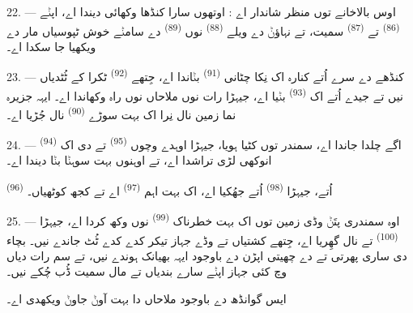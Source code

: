 22. --- اوس بالاخانے توں منظر شاندار اے : اوتھوں سارا کنڈھا وکھائی دیندا اے، اپݨے
 \textsuperscript{(86)} تے 
\textsuperscript{(87)} سمیت، تے نہاؤݨ دے ویلے 
\textsuperscript{(88)} نوں  \textsuperscript{(89)} دے سامݨے خوش ٹپوسیاں
مار دے ویکھیا جا سکدا اے۔

23. --- کنڈھے دے سرے اُتے کنارہ اک نِکا چٹانی 
\textsuperscript{(91)} بݨاندا اے، جِتھے  \textsuperscript{(92)} ٹکرا کے
ٹُٹدیاں نیں تے جیدے اُتے اک  \textsuperscript{(93)} بݨیا اے،
جیہڑا رات نوں ملاحاں نوں راہ وکھاندا اے۔ ایہہ جزیرہ نما زمین نال نِرا اک بہت
سوڑے  \textsuperscript{(90)} نال جُڑیا اے۔

\VUsaut{3.0mm}
\VUsaut{3.0mm}

24. ---  \textsuperscript{(94)} اگے چلدا جاندا اے، سمندر توں کٹیا ہویا،
جیہڑا اوہدے وچوں  \textsuperscript{(95)} تے  دی اک
انوکھی لڑی تراشدا اے، تے اوہنوں بہت سوہݨا بݨا دیندا اے۔

 \textsuperscript{(96)} اُتے، جیہڑا 
\textsuperscript{(98)} اُتے جھُکیا اے، اک بہت اہم  \textsuperscript{(97)}
اے تے کجھ کوٹھیاں۔

25. --- اوہ سمندری پتَݨ وڈی زمین توں اک بہت خطرناک 
\textsuperscript{(99)} نوں وکھ کردا اے، جیہڑا  \textsuperscript{(100)}
تے  نال گھِریا اے، جِتھے کشتیاں تے وڈے جہاز تیکر کدے کدے ٹُٹ جاندے
نیں۔ بچاء دی ساری پھرتی تے  دے چھیتی اپڑن دے باوجود ایہہ
 بھیانک ہوندے نیں، تے سم رات دیاں  وچ کئی جہاز
اپݨے سارے بندیاں تے مال سمیت ڈُب چُکے نیں۔

ایس گوانڈھ دے باوجود  ملاحاں دا بہت آوݨ جاوݨ ویکھدی اے۔
\VUsaut{6.0mm}
\VUfilet{22mm}
